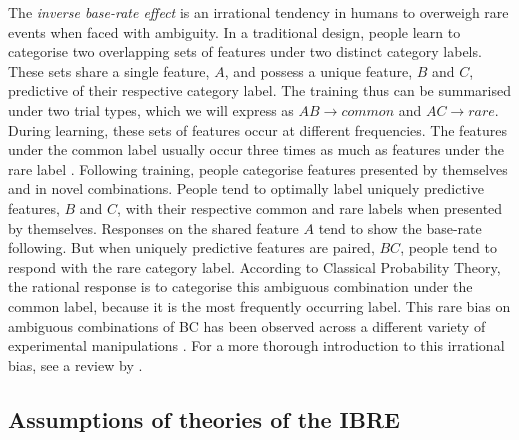 \documentclass[10pt,letterpaper]{article}
\begin{document}
The \textit{inverse base-rate effect} \cite<IBRE, >{medin1988problem} is an irrational tendency in humans to overweigh rare events when faced with ambiguity.
In a traditional design, people learn to categorise two overlapping sets of features under two distinct category labels.
These sets share a single feature, $A$, and possess a unique feature, $B$ and $C$, predictive of their respective category label.
The training thus can be summarised under two trial types, which we will express as $AB \to common$ and $AC \to rare$.
During learning, these sets of features occur at different frequencies.
The features under the common label usually occur three times as much as features under the rare label \cite{kruschke1996base}.
Following training, people categorise features presented by themselves and in novel combinations.
People tend to optimally label uniquely predictive features, $B$ and $C$, with their respective common and rare labels when presented by themselves.
Responses on the shared feature $A$ tend to show the base-rate following.
But when uniquely predictive features are paired, $BC$, people tend to respond with the rare category label.
According to Classical Probability Theory, the rational response is to categorise this ambiguous combination under the common label, because it is the most frequently occurring label.
This rare bias on ambiguous combinations of BC has been observed across a different variety of experimental manipulations \cite{kalish2001inverse,don2017effects,don2021attention,inkster2022effect,wills2014attention}.
For a more thorough introduction to this irrational bias, see a review by .

\subsection{Assumptions of theories of the IBRE}
\end{document}
